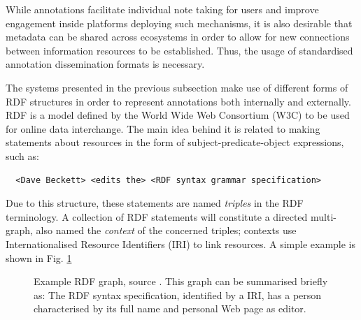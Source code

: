 
While annotations facilitate individual note taking for users and improve
engagement inside platforms deploying such mechanisms, it is also desirable
that metadata can be shared across ecosystems in order to allow for new
connections between information resources to be established. Thus, the usage of
standardised annotation dissemination formats is necessary.

The systems presented in the previous subsection make use of different forms of
RDF structures in order to represent annotations both internally and
externally.  RDF \cite{ref:rdf} is a model defined by the World Wide Web
Consortium (W3C) to be used for online data interchange. The main idea behind
it is related to making statements about resources in the form of
subject-predicate-object expressions, such as:

\begin{verbatim}
  <Dave Beckett> <edits the> <RDF syntax grammar specification>
\end{verbatim}

Due to this structure, these statements are named \textit{triples} in the RDF
terminology.  A collection of RDF statements will constitute a directed
multi-graph, also named the \textit{context} of the concerned triples; contexts
use Internationalised Resource Identifiers (IRI) to link resources. A simple
example is shown in Fig. \ref{fig:rdf}

\begin{figure}[!ht]
  \centering
  \caption[Example RDF graph]
          {Example RDF graph, source \cite{ref:rdfsyntax}. This graph
           can be summarised briefly as: The RDF syntax specification,
           identified by a IRI, has a person characterised by its full name and
           personal Web page as editor.}
  \label{fig:rdf}
\end{figure}

